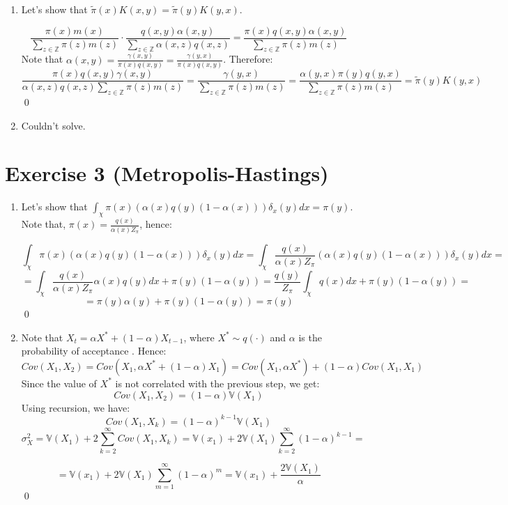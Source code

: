 \documentclass[12pt,letterpaper]{article}
\begin{document}
\begin{enumerate}[leftmargin=!,labelindent=5pt]
The event $X^{(\tau_k)}=y \mid X^{(\tau_k -1)}=x$ is equivalent
to selecting $y$ starting from $x$ and then accepting $y$, hence
$q(x,y)\cdot \alpha(x,y) \propto P(X^{(\tau_k)}=y \mid X^{(\tau_k -1)}=x)$.

Therefore, we just normalize to get the proper equation
$$P(Y^{(k)}= y \mid Y^{(k-1)}=x) =
\frac{q(x,y)\alpha(x,y)}{\sum_{z \in \mathbb Z}\alpha(x,z)q(x,y)}$$
\qed

\item Let's show that
$
\tilde{\pi}(x)K(x,y) = \tilde{\pi}(y)K(y,x)
$.

$$
\frac{\pi(x)m(x)}{\sum_{z \in \mathbb{Z}}\pi(z)m(z)} \cdot 
\frac{q(x,y)\alpha(x,y)}{\sum_{z \in \mathbb{Z}}\alpha(x,z)q(x,z)}
=
\frac{\pi(x)q(x,y)\alpha(x,y)}
{\sum_{z \in \mathbb{Z}}\pi(z)m(z)}
$$
Note that $\alpha(x,y) =
\frac{\gamma(x,y)}{\pi(x)q(x,y)} =
\frac{\gamma(y,x)}{\pi(x)q(x,y)}$. Therefore:
$$
\frac{\pi(x)q(x,y)\gamma(x,y)}
{\alpha(x,z)q(x,z)\sum_{z \in \mathbb{Z}}\pi(z)m(z)} = 
\frac{\gamma(y,x)}
{\sum_{z \in \mathbb{Z}}\pi(z)m(z)} =
\frac{\alpha(y,x)\pi(y)q(y,x)}{\sum_{z \in \mathbb{Z}}\pi(z)m(z)}=
\tilde{\pi}(y)K(y,x)
$$
\qed

\item Couldn't solve.

\end{enumerate}

\newpage
\section*{Exercise 3 (Metropolis-Hastings)}
\begin{enumerate}[leftmargin=!,labelindent=5pt]

\item Let's show that
$\int_\chi \pi(x)(\alpha(x)q(y) (1-\alpha(x)))\delta_x(y) dx = \pi(y)$.
Note that, $\pi(x) = \frac{q(x)}{\alpha(x)Z_\pi}$, hence:

$$
\int_\chi \pi(x)(\alpha(x)q(y) (1-\alpha(x)))\delta_x(y) dx =
\int_\chi \frac{q(x)}{\alpha(x)Z_\pi}(\alpha(x)q(y) (1-\alpha(x)))
\delta_x(y) dx = 
$$
$$ = 
\int_\chi \frac{q(x)}{\alpha(x)Z_\pi}\alpha(x)q(y) dx +
\pi(y)(1-\alpha(y)) = 
\frac{q(y)}{Z_\pi}\int_\chi q(x)dx +\pi(y)(1-\alpha(y)) =
$$
$$
 = \pi(y)\alpha(y) + \pi(y)(1-\alpha(y)) = \pi(y)
$$
\qed

\item Note that $X_t = \alpha X^* + (1-\alpha)X_{t-1}$, where
$X^* \sim q(\cdot)$ and $\alpha$ is the probability of acceptance
. Hence:
$$
Cov(X_1,X_2) = Cov(X_1,\alpha X^* + (1-\alpha)X_{1})=
Cov(X_1,\alpha X^*) + (1-\alpha)Cov(X_1,X_1)
$$
Since the value of $X^*$ is not correlated with the previous step,
we get:
$$Cov(X_1,X_2) = (1-\alpha) \mathbb V(X_1)$$
Using recursion, we have:
$$Cov(X_1,X_k) = (1-\alpha)^{k-1} \mathbb V(X_1)$$
$$
\sigma_X^2 = \mathbb V(X_1) + 2\sum_{k=2}^\infty Cov(X_1,X_k)=
\mathbb V(x_1) + 2\mathbb V(X_1)
\sum_{k=2}^\infty (1-\alpha)^{k-1}=
$$

$$
=
\mathbb V(x_1) + 2\mathbb V(X_1)
\sum_{m=1}^\infty (1-\alpha)^{m}=
\mathbb V(x_1) + \frac{2\mathbb V(X_1)}{\alpha}
$$
\qed


\end{enumerate}
\end{document}

